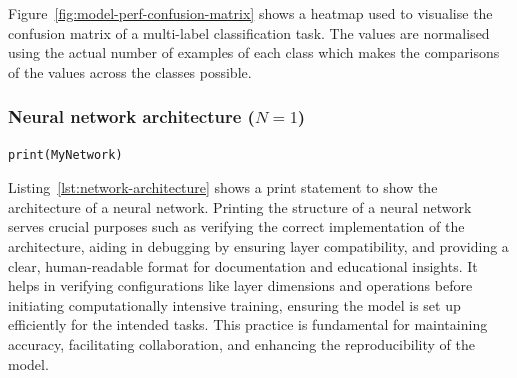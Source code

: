 Figure~\ref{fig:model-perf-confusion-matrix} shows a heatmap used to visualise the confusion matrix of a multi-label classification task. The values are normalised using the actual number of examples of each class which makes the comparisons of the values across the classes possible.

    
        



\subsubsection{Neural network architecture ($N = 1$)}

\begin{lstlisting}[caption={Print the architecture of a neural network.}, label={lst:network-architecture}]
print(MyNetwork)
\end{lstlisting}

Listing~\ref{lst:network-architecture} shows a print statement to show the architecture of a neural network. Printing the structure of a neural network serves crucial purposes such as verifying the correct implementation of the architecture, aiding in debugging by ensuring layer compatibility, and providing a clear, human-readable format for documentation and educational insights. It helps in verifying configurations like layer dimensions and operations before initiating computationally intensive training, ensuring the model is set up efficiently for the intended tasks. This practice is fundamental for maintaining accuracy, facilitating collaboration, and enhancing the reproducibility of the model.

